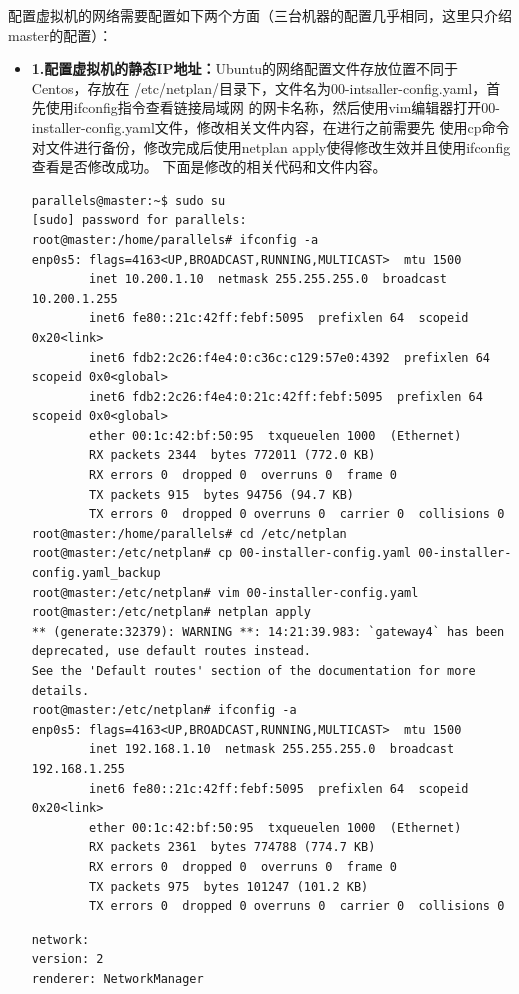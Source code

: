 \documentclass{article}
\begin{document}
\noindent 配置虚拟机的网络需要配置如下两个方面（三台机器的配置几乎相同，这里只介绍master的配置）：
\begin{itemize}
    \item \textbf{1.配置虚拟机的静态IP地址：}Ubuntu的网络配置文件存放位置不同于Centos，存放在
    /etc/netplan/目录下，文件名为00-intsaller-config.yaml，首先使用ifconfig指令查看链接局域网
    的网卡名称，然后使用vim编辑器打开00-installer-config.yaml文件，修改相关文件内容，在进行之前需要先
    使用cp命令对文件进行备份，修改完成后使用netplan apply使得修改生效并且使用ifconfig查看是否修改成功。
    下面是修改的相关代码和文件内容。
    \begin{lstlisting}[caption={配置静态IP指令}]
parallels@master:~$ sudo su
[sudo] password for parallels: 
root@master:/home/parallels# ifconfig -a
enp0s5: flags=4163<UP,BROADCAST,RUNNING,MULTICAST>  mtu 1500
        inet 10.200.1.10  netmask 255.255.255.0  broadcast 10.200.1.255
        inet6 fe80::21c:42ff:febf:5095  prefixlen 64  scopeid 0x20<link>
        inet6 fdb2:2c26:f4e4:0:c36c:c129:57e0:4392  prefixlen 64  scopeid 0x0<global>
        inet6 fdb2:2c26:f4e4:0:21c:42ff:febf:5095  prefixlen 64  scopeid 0x0<global>
        ether 00:1c:42:bf:50:95  txqueuelen 1000  (Ethernet)
        RX packets 2344  bytes 772011 (772.0 KB)
        RX errors 0  dropped 0  overruns 0  frame 0
        TX packets 915  bytes 94756 (94.7 KB)
        TX errors 0  dropped 0 overruns 0  carrier 0  collisions 0
root@master:/home/parallels# cd /etc/netplan
root@master:/etc/netplan# cp 00-installer-config.yaml 00-installer-config.yaml_backup
root@master:/etc/netplan# vim 00-installer-config.yaml
root@master:/etc/netplan# netplan apply
** (generate:32379): WARNING **: 14:21:39.983: `gateway4` has been deprecated, use default routes instead.
See the 'Default routes' section of the documentation for more details.
root@master:/etc/netplan# ifconfig -a
enp0s5: flags=4163<UP,BROADCAST,RUNNING,MULTICAST>  mtu 1500
        inet 192.168.1.10  netmask 255.255.255.0  broadcast 192.168.1.255
        inet6 fe80::21c:42ff:febf:5095  prefixlen 64  scopeid 0x20<link>
        ether 00:1c:42:bf:50:95  txqueuelen 1000  (Ethernet)
        RX packets 2361  bytes 774788 (774.7 KB)
        RX errors 0  dropped 0  overruns 0  frame 0
        TX packets 975  bytes 101247 (101.2 KB)
        TX errors 0  dropped 0 overruns 0  carrier 0  collisions 0       
    \end{lstlisting}
    \begin{lstlisting}[caption={修改后的00-installer-config.yaml文件内容}]
network:
version: 2
renderer: NetworkManager

\end{lstlisting}
\end{itemize}
\end{document}

